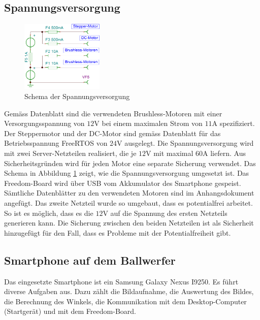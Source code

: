     \subsection{Spannungsversorgung}       
        \begin{figure}
           	\includegraphics[width=0.35\textwidth,clip,trim=0mm 0.5mm 0mm 0mm]
           	{Enddokumentation/Bilder/BeschaltungNetzteile.png}
           	\centering
           	\caption{Schema der Spannungsversorgung} 
           	\label{abb:Spannungsversorgung}
        \end{figure}
        Gemäss Datenblatt sind die verwendeten Brushless-Motoren mit einer Versorgungsspannung 
        von $12\si{\volt}$ bei einem maximalen Strom von $11\si{\ampere}$ spezifiziert. 
        Der Steppermotor und der DC-Motor sind gemäss Datenblatt für das Betriebsspannung FreeRTOS 
        von $24\si{\volt}$ ausgelegt. Die Spannungsversorgung wird mit zwei Server-Netzteilen 
        realisiert, die je $12\si{\volt}$ mit maximal $60\si{\ampere}$ liefern. Aus 
        Sicherheitsgründen wird für jeden Motor eine separate Sicherung verwendet. Das Schema 
        in Abbildung \ref{abb:Spannungsversorgung} zeigt, wie die Spannungsversorgung 
        umgesetzt ist. Das Freedom-Board wird über USB vom Akkumulator des Smartphone 
        gespeist. Sämtliche Datenblätter zu den verwendeten Motoren sind im Anhangsdokument 
        angefügt. Das zweite Netzteil wurde so umgebaut, dass es potentialfrei arbeitet. So 
        ist es möglich, dass es die $12\si{\volt}$ auf die Spannung des ersten Netzteils 
        generieren kann. Die Sicherung zwischen den beiden Netzteilen ist als Sicherheit 
        hinzugefügt für den Fall, dass es Probleme mit der Potentialfreiheit gibt.	
\newpage        
        \subsection{Smartphone auf dem Ballwerfer}
        Das eingesetzte Smartphone ist ein Samsung Galaxy Nexus I9250. Es führt diverse Aufgaben aus. Dazu zählt 
        die Bildaufnahme, die Auswertung des Bildes, die Berechnung des Winkels, die Kommunikation 
        mit dem Desktop-Computer (Startgerät) und mit dem Freedom-Board.
